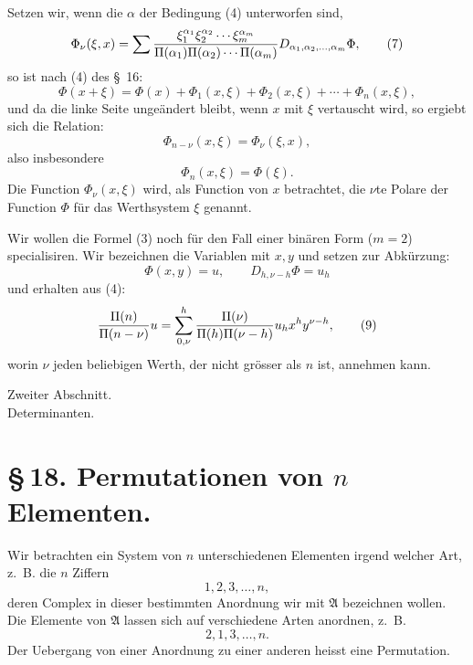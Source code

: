 \documentclass[11pt]{article}
\begin{document}
Setzen wir, wenn die $\alpha$ der Bedingung (4) unterworfen sind,
\begin{equation}
 \Phi_\nu(\xi,x)=
 \sum {\xi_1^{\alpha_1}\xi_2^{\alpha_2}\cdots\xi_m^{\alpha_m}
 \over \Pi(\alpha_1)\Pi(\alpha_2)\cdots\Pi(\alpha_m)}
 D_{\alpha_1,\alpha_2,\ldots,\alpha_m}\Phi,
\tag{7}
\end{equation}
so ist nach (4) des \S~16:
\begin{equation}
 \Phi(x+\xi)=\Phi(x)+\Phi_1(x,\xi)+\Phi_2(x,\xi)+\cdots+\Phi_n(x,\xi),
\tag{8}
\end{equation}
und da die linke Seite ungeändert bleibt, wenn $x$ mit $\xi$ vertauscht wird, so ergiebt sich die Relation:
\begin{equation}
 \Phi_{n-\nu}(x,\xi)=\Phi_\nu(\xi,x),
\tag{9}
\end{equation}
also insbesondere
\begin{equation}
 \Phi_n(x,\xi)=\Phi(\xi).
\tag{10}
\end{equation}
Die Function $\Phi_\nu(x,\xi)$ wird, als Function von $x$ betrachtet, die $\nu$te Polare der Function $\Phi$ für das Werthsystem $\xi$ genannt.

Wir wollen die Formel (3) noch für den Fall einer binären Form ($m=2$) specialisiren. Wir bezeichnen die Variablen mit $x,y$ und setzen zur Abkürzung:
\[
 \Phi(x,y)=u,\qquad D_{h,\nu-h}\Phi=u_h
\]
und erhalten aus (4):
\begin{equation}
 {\Pi(n)\over\Pi(n-\nu)}u
 =
 \sum_{0,\nu}^{h}{\Pi(\nu)\over\Pi(h)\Pi(\nu-h)}
 u_h x^h y^{\nu-h},
\tag{9}
\end{equation}
worin $\nu$ jeden beliebigen Werth, der nicht grösser als $n$ ist, annehmen kann.


\clearpage
\begin{center}
{\large Zweiter Abschnitt.}\\[0.5em]
{\Large Determinanten.}\\[0.4em]
\end{center}

\section*{\S\,18. Permutationen von \(n\) Elementen.}

Wir betrachten ein System von \(n\) unterschiedenen Elementen irgend welcher Art, z.~B. die \(n\) Ziffern
\[
1,2,3,\ldots,n,
\]
deren Complex in dieser bestimmten Anordnung wir mit \(\mathfrak A\) bezeichnen wollen. Die Elemente von \(\mathfrak A\) lassen sich auf verschiedene Arten anordnen, z.~B.
\[
2,1,3,\ldots,n.
\]
Der Uebergang von einer Anordnung zu einer anderen heisst eine Permutation.
\end{document}

